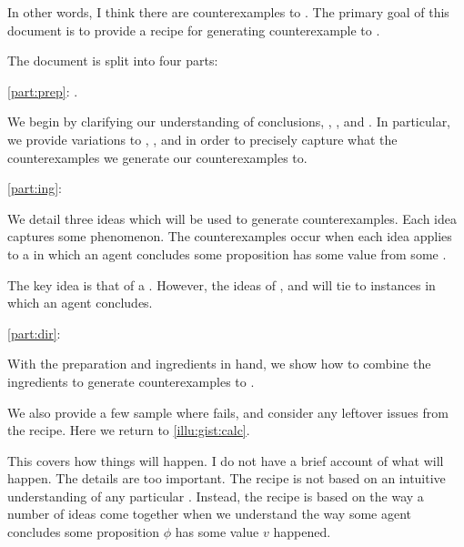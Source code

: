 \begin{note}
  In other words, I think there are counterexamples to \issueInclusion{}.
  The primary goal of this document is to provide a recipe for generating counterexample to \issueInclusion{}.

  The document is split into four parts:

  \begin{TOCEnum}
  \item
    \autoref{part:prep}: .

    We begin by clarifying our understanding of conclusions, \qWhy{}, \qHow{}, and \issueInclusion{}.
    In particular, we provide variations to \qWhy{}, \qHow{}, and \issueInclusion{} in order to precisely capture what the counterexamples we generate our counterexamples to.
  \item
    \autoref{part:ing}: 

    We detail three ideas which will be used to generate counterexamples.
    Each idea captures some phenomenon.
    The counterexamples occur when each idea applies to a  in which an agent concludes some proposition has some value from some \pool{}.

    The key idea is that of a \fc{}.
    However, the ideas of \tC{}, and \requ{} will tie  to instances in which an agent concludes.
  \item
    \autoref{part:dir}: 

    With the preparation and ingredients in hand, we show how to combine the ingredients to generate counterexamples to \issueInclusion{}.

    We also provide a few sample  where \issueInclusion{} fails, and consider any leftover issues from the recipe.
    Here we return to \autoref{illu:gist:calc}.
  \end{TOCEnum}

  This covers how things will happen.
  I do not have a brief account of what will happen.
  The details are too important.
  The recipe is not based on an intuitive understanding of any particular \scen{}.
  Instead, the recipe is based on the way a number of ideas come together when we understand the way some agent concludes some proposition \(\phi\) has some value \(v\) happened.
\end{note}




